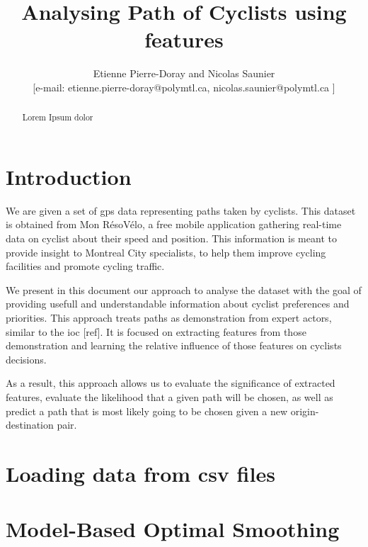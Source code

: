 \documentclass{article}
\begin{document}
\title{Analysing Path of Cyclists using features}
\author{Etienne Pierre-Doray and Nicolas Saunier%
\\
{\normalsize [e-mail: etienne.pierre-doray@polymtl.ca,  nicolas.saunier@polymtl.ca ]}%
}

\maketitle
\thispagestyle{empty}

\begin{abstract}
Lorem Ipsum dolor
\end{abstract}

\section{Introduction}\label{Sec:Intro}

We are given a set of \gls{gps} data representing paths taken by 
cyclists. This dataset is obtained from Mon RésoVélo, a free mobile application
gathering real-time data on cyclist about their speed and position. This information is meant to provide insight to Montreal City specialists, to help them improve cycling facilities and promote cycling traffic.

We present in this document our approach to analyse the dataset with the goal of
providing usefull and understandable information about cyclist preferences and priorities. This approach treats paths as demonstration from expert actors, similar to the \gls{ioc} [ref]. It is focused on extracting features from those demonstration 
and learning the relative influence of those features on cyclists decisions.  

As a result, this approach allows us to evaluate the significance of extracted features, evaluate the likelihood that a given path will be chosen, as well as predict a path that is most likely going to be chosen given a new origin-destination pair.


\section{Loading data from csv files}\label{Sec:Load}

\section{Model-Based Optimal Smoothing}\label{Sec:Smoothing}
\end{document}
